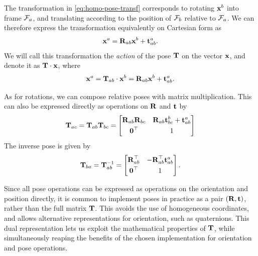 The transformation in \eqref{eq:homo-pose-transf} corresponds to rotating ${\boldsymbol{\mathbf{x}}}^b$ into frame $\mathcal{F}_a$, and translating according to the position of $\mathcal{F}_b$ relative to $\mathcal{F}_a$.
We can therefore express the transformation equivalently on Cartesian form as
\begin{equation}
  {\boldsymbol{\mathbf{x}}}^a = {\boldsymbol{\mathbf{R}}}_{ab} {\boldsymbol{\mathbf{x}}}^b + {\boldsymbol{\mathbf{t}}}^a_{ab}.
\end{equation}
We will call this transformation the \emph{action} of the pose ${\boldsymbol{\mathbf{T}}}$ on the vector ${\boldsymbol{\mathbf{x}}}$, and denote it as ${\boldsymbol{\mathbf{T}}} \cdot {\boldsymbol{\mathbf{x}}}$, where
\begin{equation}
  {\boldsymbol{\mathbf{x}}}^a = {\boldsymbol{\mathbf{T}}}_{ab} \cdot {\boldsymbol{\mathbf{x}}}^b = {\boldsymbol{\mathbf{R}}}_{ab} {\boldsymbol{\mathbf{x}}}^b + {\boldsymbol{\mathbf{t}}}^a_{ab}.
\end{equation}

As for rotations, we can compose relative poses with matrix multiplication.
This can also be expressed directly as operations on ${\boldsymbol{\mathbf{R}}}$ and ${\boldsymbol{\mathbf{t}}}$ by
\begin{equation}
  {\boldsymbol{\mathbf{T}}}_{ac} = {\boldsymbol{\mathbf{T}}}_{ab} {\boldsymbol{\mathbf{T}}}_{bc} =
  \begin{bmatrix}
    {\boldsymbol{\mathbf{R}}}_{ab} {\boldsymbol{\mathbf{R}}}_{bc} & {\boldsymbol{\mathbf{R}}}_{ab} {\boldsymbol{\mathbf{t}}}^b_{bc} + {\boldsymbol{\mathbf{t}}}^a_{ab}\\[0.3em]
    \boldsymbol{\mathbf{0}}^{\top} & 1
  \end{bmatrix}
\end{equation}
The inverse pose is given by
\begin{equation}
  {\boldsymbol{\mathbf{T}}}_{ba} = {\boldsymbol{\mathbf{T}}}_{ab}^{-1} = 
  \begin{bmatrix}
    {\boldsymbol{\mathbf{R}}}_{ab}^{\top}  & -{\boldsymbol{\mathbf{R}}}_{ab}^{\top} {\boldsymbol{\mathbf{t}}}^a_{ab}\\[0.3em]
    \boldsymbol{\mathbf{0}}^{\top} & 1
  \end{bmatrix}.
\end{equation}

Since all pose operations can be expressed as operations on the orientation and position directly, it is common to implement poses in practice as a pair $({\boldsymbol{\mathbf{R}}}, {\boldsymbol{\mathbf{t}}})$, rather than the full matrix ${\boldsymbol{\mathbf{T}}}$.
This avoids the use of homogeneous coordinates, and allows alternative representations for orientation, such as quaternions.
This dual representation lets us exploit the mathematical properties of ${\boldsymbol{\mathbf{T}}}$, while simultaneously reaping the benefits of the chosen implementation for orientation and pose operations.

